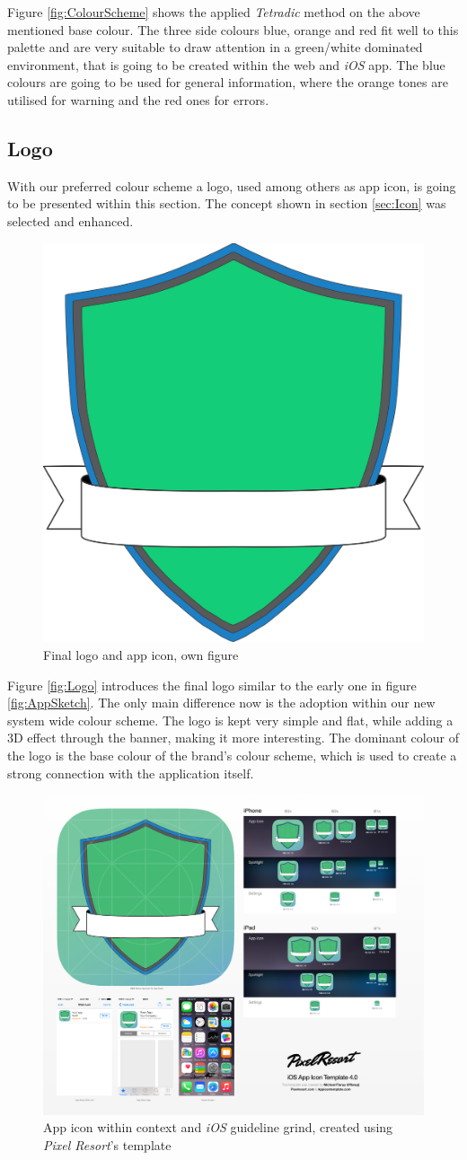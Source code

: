 Figure \vref{fig:ColourScheme} shows the applied \emph{Tetradic} method on the above mentioned base colour. The three side colours blue, orange and red fit well to this palette and are very suitable to draw attention in a green/white dominated environment, that is going to be created within the web and \emph{iOS} app. The blue colours are going to be used for general information, where the orange tones are utilised for warning and the red ones for errors.

\subsection{Logo}
\label{sec:Logo}
With our preferred colour scheme a logo, used among others as app icon, is going to be presented within this section. The concept shown in section \vref{sec:Icon} was selected and enhanced. 

\begin{figure}[h]
  	\centering
  	\includegraphics[width=0.45\linewidth]{./images/logo-final.png}
  	\caption{Final logo and app icon, own figure}
	\label{fig:Logo}
\end{figure}

Figure \vref{fig:Logo} introduces the final logo similar to the early one in figure \vref{fig:AppSketch}. The only main difference now is the adoption within our new system wide colour scheme. The logo is kept very simple and flat, while adding a 3D effect through the banner, making it more interesting. The dominant colour of the logo is the base colour of the brand's colour scheme, which is used to create a strong connection with the application itself.

\begin{figure}[h]
  	\centering
  	\includegraphics[width=0.6\linewidth]{./images/icon-context.png}
  	\caption{App icon within context and \emph{iOS} guideline grind, created using \emph{Pixel Resort}'s template}
	\label{fig:IconFinal}
\end{figure}

